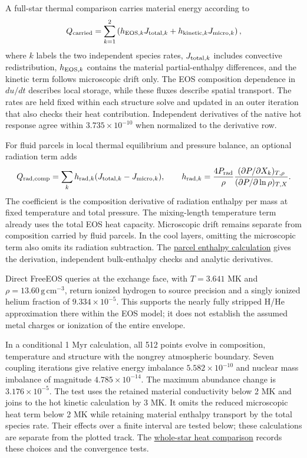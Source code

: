 \documentclass[11pt,letterpaper]{article}
\newcommand{\doc}[2]{\href{https://github.com/oklo/ember/blob/codex/atmosphere5000-density-checks/#1}{#2}}
\begin{document}
A full-star thermal comparison carries material energy according to
\begin{equation}
 Q_{\rm carried}=\sum_{k=1}^{2}\left(h_{{\rm EOS},k}J_{{\rm total},k}
 +h_{{\rm kinetic},k}J_{{\rm micro},k}\right),
\end{equation}
where $k$ labels the two independent species rates,
$J_{{\rm total},k}$ includes convective redistribution,
$h_{{\rm EOS},k}$ contains the material partial-enthalpy differences,
and the kinetic term follows microscopic drift only. The EOS composition
dependence in $du/dt$ describes local storage, while these fluxes describe
spatial transport. The rates are held fixed within each structure solve and
updated in an outer iteration that also checks their heat contribution.
Independent derivatives of the native hot response agree within
$3.735\times10^{-10}$ when normalized to the derivative row.

For fluid parcels in local thermal equilibrium and pressure balance, an
optional radiation term adds
\begin{equation}
 Q_{\rm rad,comp}=\sum_k h_{{\rm rad},k}
   (J_{{\rm total},k}-J_{{\rm micro},k}),\qquad
 h_{{\rm rad},k}=\frac{4P_{\rm rad}}{\rho}
   \frac{(\partial P/\partial X_k)_{T,\rho}}
        {(\partial P/\partial\ln\rho)_{T,X}}.
\end{equation}
The coefficient is the composition derivative of radiation enthalpy per
mass at fixed temperature and total pressure. The mixing-length temperature
term already uses the total EOS heat capacity. Microscopic drift remains
separate from composition carried by fluid parcels. In the cool layers,
omitting the microscopic term also omits its radiation subtraction.
The \doc{docs/CONVECTIVE_RADIATION_ENTHALPY.md}{parcel enthalpy calculation}
gives the derivation, independent bulk-enthalpy checks and analytic derivatives.

Direct FreeEOS queries at the exchange face, with $T=3.641$ MK and
$\rho=13.60\,\mathrm{g\,cm^{-3}}$, return ionized hydrogen to source precision
and a singly ionized helium fraction of $9.334\times10^{-5}$.
This supports the nearly fully stripped H/He approximation there within the
EOS model; it does not establish the assumed metal charges or ionization of
the entire envelope.

In a conditional 1 Myr calculation, all 512 points evolve in composition,
temperature and structure with the nongrey atmospheric boundary. Seven
coupling iterations give relative energy imbalance $5.582\times10^{-10}$
and nuclear mass imbalance of magnitude $4.785\times10^{-14}$.
The maximum abundance change is $3.176\times10^{-5}$.
The test uses the retained material conductivity below 2 MK and joins to
the hot kinetic calculation by 3 MK. It omits the reduced microscopic heat
term below 2 MK while retaining material enthalpy transport by the total
species rate. Their effects over a finite interval are tested below;
these calculations are separate from the plotted track.
The \doc{docs/TOTAL_SPECIES_HEAT.md}{whole-star heat comparison} records
these choices and the convergence tests.
\end{document}
